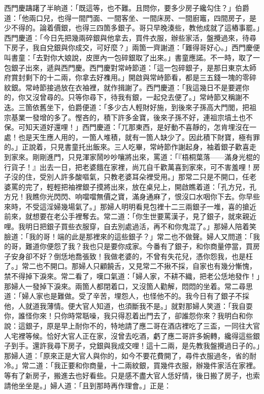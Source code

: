 西門慶躊躇了半晌道：「既這等，也不難。且問你，要多少房子纔勾住？」伯爵道：「他兩口兒，也得一間門面、一間客坐、一間床房、一間廚竈，四間房子，是少不得的。論着價銀，也得三四箇多銀子。哥只早晚湊些，教他成就了這樁事罷。」西門慶道：「今日先把幾兩碎銀與他拿去，買件衣服，辦些家活，盤攪過來，待尋下房子，我自兌銀與你成交，可好麼？」兩箇一齊謝道：「難得哥好心。」西門慶便叫書童：「去對你大娘說，皮匣內一包碎銀取了出來。」書童應諾。不一時，取了一包銀子出來，遞與西門慶。西門慶對常峙節道：「這一包碎銀子，是那日東京太師府賞封剩下的十二兩，你拿去好襍用。」開啟與常峙節看，都是三五錢一塊的零碎紋銀。常峙節接過放在衣袖裡，就作揖謝了。西門慶道：「我這幾日不是要遲你的，你又沒曾尋的。只等你尋下，待我有銀，一起兌去便了。」常峙節又稱謝不迭。{}三箇依舊坐下，伯爵便道：「多少古人輕財好施，到後來子孫高大門閭，把祖宗基業一發增的多了。慳吝的，積下許多金寶，後來子孫不好，連祖宗墳土也不保。可知天道好還哩！」西門慶道：「兀那東西，是好動不喜靜的，怎肯埋沒在一處！也是天生應人用的，一箇人堆積，就有一箇人缺少了。因此積下財寶，極有罪的。」{}正說着，只見書童托出飯來。三人吃畢，常峙節作謝起身，袖着銀子歡喜走到家來。剛剛進門，只見渾家鬧吵吵嚷將出來，罵道：「『梧桐葉落——滿身光棍的行貨子！』出去一日，把老婆餓在家裡，尚兀自千歡萬喜到家來，可不害羞哩！房子沒的住，受別人許多酸嘔氣，只教老婆耳朵裡受用。」那常二只是不開口，{}任老婆罵的完了，輕輕把袖裡銀子摸將出來，放在桌兒上，開啟瞧着道：「孔方兄，孔方兄！我瞧你光閃閃、响噹噹無價之寶，滿身通麻了，恨沒口水咽你下去。你早些來時，不受這淫婦幾場氣了。」{}那婦人明明看見包裡十二三兩銀子一堆，喜的搶近前來，就想要在老公手裡奪去。{}常二道：「你生世要罵漢子，見了銀子，就來親近哩。我明日把銀子買些衣服穿，自去別處過活，再不和你鬼混了。」那婦人陪着笑臉道：「我的哥！端的此是那裡來的這些銀子？」常二也不做聲。婦人又問道：「我的哥，難道你便怨了我？我也只是要你成家。今番有了銀子，和你商量停當，買房子安身卻不好？倒恁地喬張致！我做老婆的，不曾有失花兒，憑你怨我，也是枉了。」常二也不開口。那婦人只顧饒舌，又見常二不揪不採，自家也有幾分慚愧，禁不得掉下淚來。常二看了，嘆口氣道：「婦人家，不耕不織，把老公恁地發作！」那婦人一發掉下淚來。{}兩箇人都閉着口，又沒箇人勸解，悶悶的坐着。{}常二尋思道：「婦人家也是難做。受了辛苦，埋怨人，也怪他不的。我今日有了銀子不採他，人就道我薄情。{}便大官人知道，也須斷我不是。」就對那婦人笑道：「我自耍你，誰怪你來！只你時常聒噪，我只得忍着出門去了，卻誰怨你來？我明白和你說：這銀子，原是早上耐你不的，特地請了應二哥在酒店裡吃了三盃，一同往大官人宅裡等候。恰好大官人正在家，沒曾去吃酒，虧了應二哥許多婉轉，纔得這些銀子到手。還許我尋下房子，兌銀與我成交哩！這十二兩，是先教我盤攪過日子的。」那婦人道：「原來正是大官人與你的，如今不要花費開了，尋件衣服過冬，省的耐冷。」常二道：「我正要和你商量，十二兩紋銀，買幾件衣服，辦幾件家活在家裡。等有了新房子，搬進去也好看些。只是感不盡大官人恁好情，{}後日搬了房子，也索請他坐坐是。」婦人道：「且到那時再作理會。」正是：

